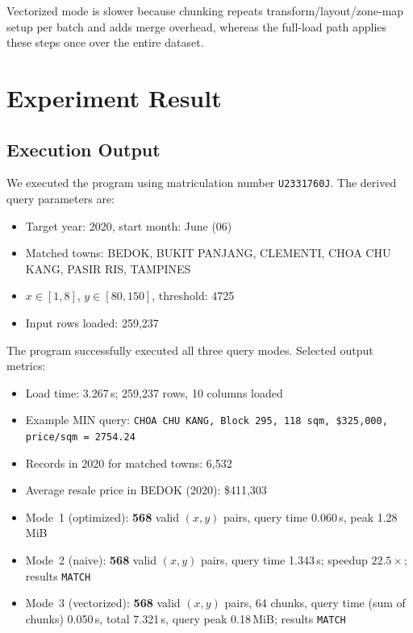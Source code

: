 \documentclass[11pt,a4paper]{article}
\begin{document}
Vectorized mode is slower because chunking repeats transform/layout/zone-map setup per batch and adds merge overhead, whereas the full-load path applies these steps once over the entire dataset.


\section{Experiment Result}

\subsection{Execution Output}

We executed the program using matriculation number \texttt{U2331760J}. The derived query parameters are:
\begin{itemize}[nosep]
    \item Target year: 2020, start month: June (06)
    \item Matched towns: BEDOK, BUKIT PANJANG, CLEMENTI, CHOA CHU KANG, PASIR RIS, TAMPINES
    \item $x \in [1, 8]$, $y \in [80, 150]$, threshold: 4725
    \item Input rows loaded: 259,237
\end{itemize}

The program successfully executed all three query modes. Selected output metrics:
\begin{itemize}[nosep]
    \item Load time: 3.267\,s; 259,237 rows, 10 columns loaded
    \item Example MIN query: \texttt{CHOA CHU KANG, Block 295, 118\,sqm, \$325,000, price/sqm = 2754.24}
    \item Records in 2020 for matched towns: 6,532
    \item Average resale price in BEDOK (2020): \$411,303
    \item Mode~1 (optimized): \textbf{568} valid $(x, y)$ pairs, query time 0.060\,s, peak 1.28\,MiB
    \item Mode~2 (naive): \textbf{568} valid $(x, y)$ pairs, query time 1.343\,s; speedup $22.5\times$; results \texttt{MATCH}
    \item Mode~3 (vectorized): \textbf{568} valid $(x, y)$ pairs, 64 chunks, query time (sum of chunks) 0.050\,s, total 7.321\,s, query peak 0.18\,MiB; results \texttt{MATCH}
\end{itemize}
\end{document}
